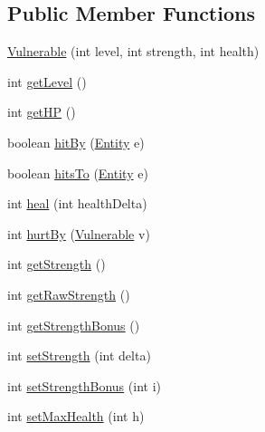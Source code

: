 \subsection*{Public Member Functions}
\begin{DoxyCompactItemize}
\item 
\hyperlink{classjdungeon_1_1core_1_1world_1_1_vulnerable_a02b65cf3adda7a77a0d0455943f6d879}{Vulnerable} (int level, int strength, int health)
\item 
int \hyperlink{classjdungeon_1_1core_1_1world_1_1_vulnerable_a5eff736ac3c1dc77404368fb0e069320}{getLevel} ()
\item 
int \hyperlink{classjdungeon_1_1core_1_1world_1_1_vulnerable_adb7c5a193d5f727f17c0c137e2ff3fa0}{getHP} ()
\item 
boolean \hyperlink{classjdungeon_1_1core_1_1world_1_1_vulnerable_a51cba2942f2b57bdb39b4f69ffd16241}{hitBy} (\hyperlink{classjdungeon_1_1core_1_1world_1_1_entity}{Entity} e)
\item 
boolean \hyperlink{classjdungeon_1_1core_1_1world_1_1_vulnerable_a622ad6fd715b134f6508e000eb7b4785}{hitsTo} (\hyperlink{classjdungeon_1_1core_1_1world_1_1_entity}{Entity} e)
\item 
int \hyperlink{classjdungeon_1_1core_1_1world_1_1_vulnerable_a617c57277ccac3409bc686f94fa92ea5}{heal} (int healthDelta)
\item 
int \hyperlink{classjdungeon_1_1core_1_1world_1_1_vulnerable_a5a5fd985229f2087e93869df0abc4f16}{hurtBy} (\hyperlink{classjdungeon_1_1core_1_1world_1_1_vulnerable}{Vulnerable} v)
\item 
int \hyperlink{classjdungeon_1_1core_1_1world_1_1_vulnerable_adf9a368d3db536032e75382abdd373e4}{getStrength} ()
\item 
int \hyperlink{classjdungeon_1_1core_1_1world_1_1_vulnerable_a23e72ca7d75449518977e497da993823}{getRawStrength} ()
\item 
int \hyperlink{classjdungeon_1_1core_1_1world_1_1_vulnerable_affe3e78949e4939e0ac7988a13d81b67}{getStrengthBonus} ()
\item 
int \hyperlink{classjdungeon_1_1core_1_1world_1_1_vulnerable_ac81a68403f86fd07aea32f78d4c5db70}{setStrength} (int delta)
\item 
int \hyperlink{classjdungeon_1_1core_1_1world_1_1_vulnerable_aff31e13ced994a738cf026eb499d5b67}{setStrengthBonus} (int i)
\item 
int \hyperlink{classjdungeon_1_1core_1_1world_1_1_vulnerable_a3b21f2ca2b09e59b6eaee07a970c6dfb}{setMaxHealth} (int h)
\item 

\end{DoxyCompactItemize}
